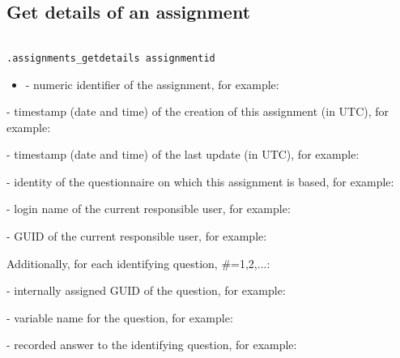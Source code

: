 \subsection{Get details of an assignment}

\begin{lstlisting}[style=CommandLineStyle, showlines=true]

.assignments_getdetails assignmentid

\end{lstlisting}

\paramsheader
\begin{itemize}
    \item {} - numeric identifier of the assignment, for
    example:
\end{itemize}

\savedres
\begin{compactitem}

    \item {} - timestamp (date and time) of the
    creation of this assignment (in UTC), for example:

    \item {} - timestamp (date and time) of the last
    update (in UTC), for example:

    \item {}  - identity of the questionnaire on
    which this assignment is based, for example:

    \item {} - login name of the current
    responsible user, for example:

    \item {} - GUID of the current responsible user,
    for example:

\end{compactitem}

\vskip16pt
Additionally, for each identifying question, \#=1,2,...:
\begin{compactitem}

    \item {} - internally assigned GUID of the question,
    for example:

    \item {} - variable name for the question,
    for example:

    \item {} - recorded answer to the identifying
    question, for example:

\end{compactitem}

